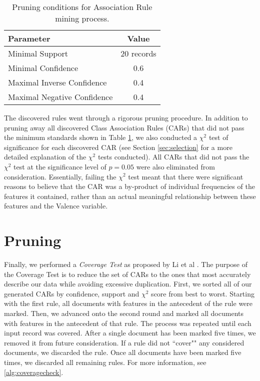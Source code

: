 \begin{table}
    \centering
    \begin{tabular}{|l|c|}
    \hline
    \textsf{Parameter} & \textsf{Value} \\
    \hline
    Minimal Support  &  20 records\\ 
    \hline
    Minimal Confidence & 0.6 \\
    Maximal Inverse Confidence & 0.4\\
    Maximal Negative Confidence& 0.4\\
    \hline
    \end{tabular}
    \caption{Pruning conditions for Association Rule mining process.}
    \label{tab:AR}
\end{table} 
 
  The discovered rules went through a rigorous pruning procedure. In addition
  to pruning away all discovered Class Association Rules (CARs) that did not
  pass the minimum standards shown in Table \ref{tab:AR}, we also conducted
  a $\chi^2$ test of significance for each discovered CAR (see Section \ref{sec:selection}
  for a more detailed explanation of the $\chi^2$ tests conducted). All CARs
  that did not pass the $\chi^2$ test at the significance level of
  $p=0.05$ were also eliminated from consideration. Essentially, failing
  the $\chi^2$ test meant that there were significant reasons to believe that 
  the CAR was a by-product of individual frequencies of the features it contained,
  rather than an actual meaningful relationship between these features and
  the \textsf{Valence} variable.
  
  \section{Pruning}
  
Finally, we performed a \textit{Coverage Test} as proposed by Li et al \cite{cmar}. The purpose of the \textsf{Coverage Test} is to reduce the set of CARs to the ones that most accurately describe our data while avoiding excessive duplication. First, we sorted all of our generated CARs by confidence, support and $\chi^2$ score from best to worst. Starting with the first rule, all documents with features in the antecedent of the rule were marked. Then, we advanced onto the second round and marked all documents with features in the antecedent of that rule. The process was repeated until each input record was covered. After a single document has been marked five times, we removed it from future consideration. If a rule did not ``cover"" any considered documents, we discarded the rule. Once all documents have been marked five times, we discarded all remaining rules. For more information, see \ref{alg:coveragecheck}.
 
